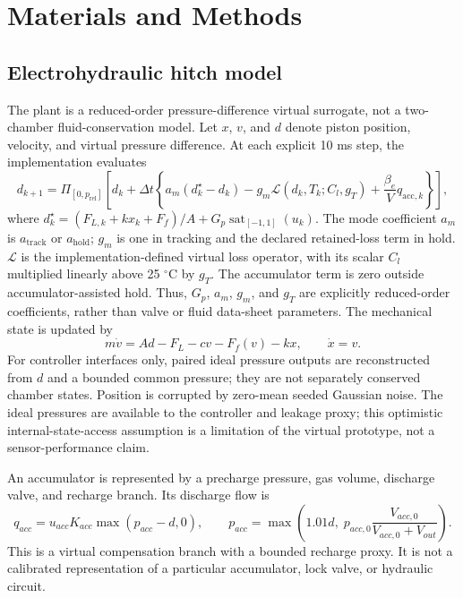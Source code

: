 \documentclass[agriengineering,article,submit,moreauthors]{Definitions/mdpi}
\begin{document}
\section{Materials and Methods}
\subsection{Electrohydraulic hitch model}
The plant is a reduced-order pressure-difference virtual surrogate, not a two-chamber fluid-conservation model. Let $x$, $v$, and $d$ denote piston position, velocity, and virtual pressure difference. At each explicit 10 ms step, the implementation evaluates
\begin{equation}
 d_{k+1}=\Pi_{[0,p_{\mathrm{rel}}]}\left[d_k+\Delta t\left\{a_m(d_k^\star-d_k)-g_m\mathcal{L}(d_k,T_k;C_l,g_T)+\frac{\beta_e}{V}q_{\mathrm{acc},k}\right\}\right],
\end{equation}
where $d_k^\star=(F_{L,k}+kx_k+F_f)/A+G_p\operatorname{sat}_{[-1,1]}(u_k)$. The mode coefficient $a_m$ is $a_{\mathrm{track}}$ or $a_{\mathrm{hold}}$; $g_m$ is one in tracking and the declared retained-loss term in hold. $\mathcal{L}$ is the implementation-defined virtual loss operator, with its scalar $C_l$ multiplied linearly above 25 $^\circ$C by $g_T$. The accumulator term is zero outside accumulator-assisted hold. Thus, $G_p$, $a_m$, $g_m$, and $g_T$ are explicitly reduced-order coefficients, rather than valve or fluid data-sheet parameters. The mechanical state is updated by
\begin{equation}
 m\dot v=Ad-F_L-cv-F_f(v)-kx,\qquad \dot x=v.
\end{equation}
For controller interfaces only, paired ideal pressure outputs are reconstructed from $d$ and a bounded common pressure; they are not separately conserved chamber states. Position is corrupted by zero-mean seeded Gaussian noise. The ideal pressures are available to the controller and leakage proxy; this optimistic internal-state-access assumption is a limitation of the virtual prototype, not a sensor-performance claim.

An accumulator is represented by a precharge pressure, gas volume, discharge valve, and recharge branch. Its discharge flow is
\begin{equation}
q_{acc}=u_{acc}K_{acc}\max(p_{acc}-d,0),\qquad
p_{acc}=\max\left(1.01d,\;p_{acc,0}\frac{V_{acc,0}}{V_{acc,0}+V_{out}}\right).
\end{equation}
This is a virtual compensation branch with a bounded recharge proxy. It is not a calibrated representation of a particular accumulator, lock valve, or hydraulic circuit.
\end{document}
